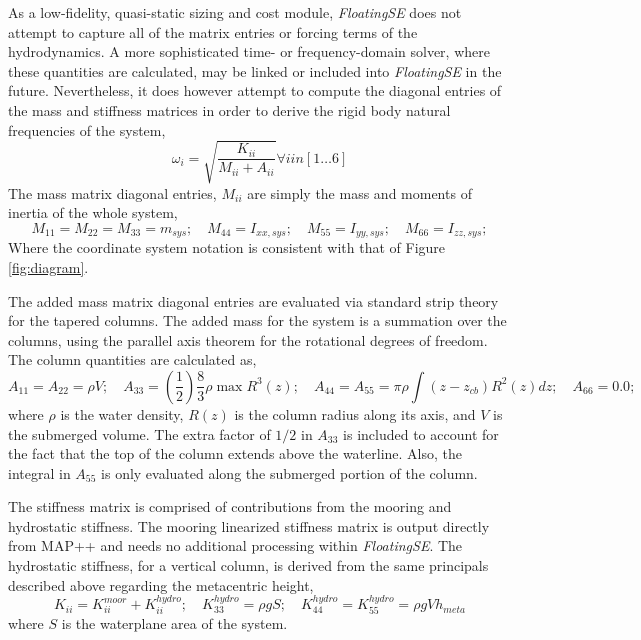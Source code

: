 As a low-fidelity, quasi-static sizing and cost module,
\textit{FloatingSE} does not attempt to capture all of the matrix
entries or forcing terms of the hydrodynamics.  A more sophisticated
time- or frequency-domain solver, where these quantities are calculated, may be linked or included into
\textit{FloatingSE} in the future.  Nevertheless, it does however attempt
to compute the diagonal entries of the mass and stiffness matrices in
order to derive the rigid body natural frequencies of the system,
\[
  \omega_i = \sqrt{\frac{K_{ii}}{M_{ii}+A_{ii}}} \forall i in \left[1\ldots6\right] 
\]
The mass matrix diagonal entries, $M_{ii}$ are simply the mass and
moments of inertia of the whole system,
\[
  M_{11} = M_{22} = M_{33} = m_{sys};\quad M_{44} = I_{xx,sys};\quad M_{55} = I_{yy,sys};\quad M_{66} = I_{zz,sys};
\]
Where the coordinate system notation is consistent with that of Figure
\ref{fig:diagram}.

The added mass matrix diagonal entries are evaluated via standard strip
theory for the tapered columns.  The added mass for the system is a
summation over the columns, using the parallel axis theorem for the
rotational degrees of freedom.  The column quantities are calculated as,
\[
  A_{11} = A_{22} = \rho V;\quad A_{33} = 
  \left(\frac{1}{2}\right)\frac{8}{3} \rho \max R^3(z) ;\quad A_{44} =
  A_{55} = \pi\rho\int\left(z-z_{cb}\right)R^2(z)dz;\quad A_{66} = 0.0;
\]
where $\rho$ is the water density, $R(z)$ is the column radius along its
axis, and $V$ is the submerged volume.  The extra factor of $1/2$ in
$A_{33}$ is included to account for the fact that the top of the column
extends above the waterline.  Also, the integral in $A_{55}$ is only evaluated
along the submerged portion of the column.

The stiffness matrix is comprised of contributions from the mooring
and hydrostatic stiffness.  The mooring linearized stiffness matrix is output
directly from MAP++ and needs no additional processing within
\textit{FloatingSE}.  The hydrostatic stiffness, for a vertical column, is derived from the same
principals described above regarding the metacentric height,
\[
  K_{ii} = K_{ii}^{moor} + K_{ii}^{hydro};\quad K_{33}^{hydro} = \rho g
  S;\quad K_{44}^{hydro} =  K_{55}^{hydro} = \rho g V h_{meta}
\]
where $S$ is the waterplane area of the system.
